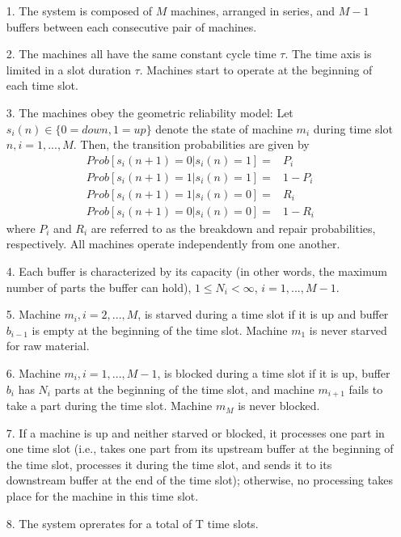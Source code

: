 \begin{itemize}
    \item[1.] The system is composed of $M$ machines, arranged in series, and $M-1$ buffers between each consecutive pair of machines.
    \item[2.] The machines all have the same constant cycle time $\tau$. The time axis is limited in a slot duration $\tau$. Machines start to operate at the beginning of each time slot.
    \item[3.] The machines obey the geometric reliability model: Let $s_i(n) \in \{0 = down, 1 = up\} $ denote the state of machine $m_i$ during time slot $n, i = 1, . . . , M$. Then, the transition probabilities are given by
    \begin{equation}
        \begin{aligned}
            Prob[s_i(n+1)=0|s_i(n)=1]=&P_i \\
            Prob[s_i(n+1)=1|s_i(n)=1]=&1-P_i \\
            Prob[s_i(n+1)=1|s_i(n)=0]=&R_i \\
            Prob[s_i(n+1)=0|s_i(n)=0]=&1-R_i
        \end{aligned}
        \label{transition probabilities}
    \end{equation}
    where $ P_i $ and $R_i$ are referred to as the breakdown and repair probabilities, respectively. All machines operate independently from one another.
    \item[4.] Each buffer is characterized by its capacity (in other words, the maximum number of parts the buffer can hold), $1 \leq N_i < \infty$, $i = 1, . . . , M-1$.
    \item[5.] Machine $m_i, i = 2, . . . , M$, is starved during a time slot if it is up and buffer $b_{i-1}$ is empty at the beginning of the time slot. Machine $m_1$ is never starved for raw material.
    \item[6.] Machine $m_i,i = 1,...,M-1$, is blocked during a time slot if it is up, buffer $b_i$ has $N_i$ parts at the beginning of the time slot, and machine $m_{i+1}$ fails to take a part during the time slot. Machine $m_M$ is never blocked.
    \item[7.] If a machine is up and neither starved or blocked, it processes one part in one time slot (i.e., takes one part from its upstream buffer at the beginning of the time slot, processes it during the time slot, and sends it to its downstream buffer at the end of the time slot); otherwise, no processing takes place for the machine in this time slot.
    \item[8.] The system oprerates for a total of T time slots.
\end{itemize}

